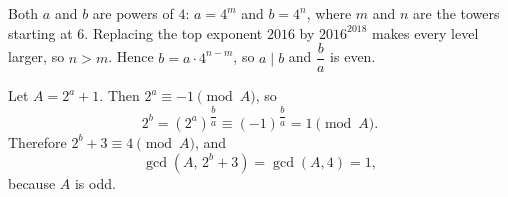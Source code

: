Both $a$ and $b$ are powers of $4$: $a=4^m$ and $b=4^n$, where $m$ and $n$ are the towers starting at $6$. Replacing the top exponent $2016$ by $2016^{2018}$ makes every level larger, so $n>m$. Hence $b=a\cdot 4^{n-m}$, so $a\mid b$ and $\dfrac{b}{a}$ is even.

Let $A=2^a+1$. Then $2^a\equiv -1\pmod A$, so
\[2^b=\left(2^a\right)^{\dfrac{b}{a}}\equiv(-1)^{\dfrac{b}{a}}=1\pmod A.\]
Therefore $2^b+3\equiv 4\pmod A$, and
\[\gcd(A,\,2^b+3)=\gcd(A,4)=\boxed{1},\]
because $A$ is odd.
